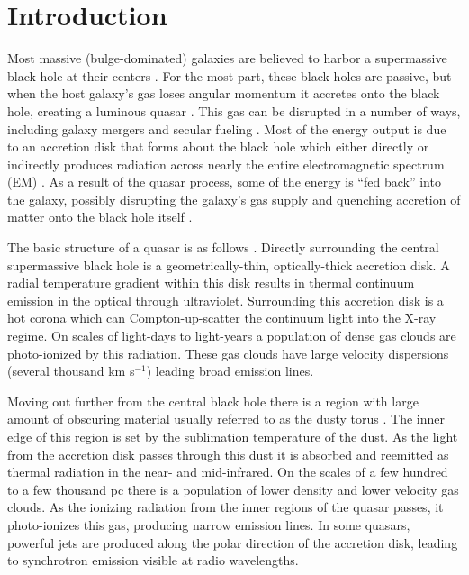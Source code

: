 \chapter{Introduction}

Most massive (bulge-dominated) galaxies are believed to harbor a supermassive black hole at their centers \citep{Kormendy:1995}.  For the most part, these black holes are passive, but when the host galaxy's gas loses angular momentum it accretes onto the black hole, creating a luminous quasar \citep{Lynden-Bell:1969}. This gas can be disrupted in a number of ways, including galaxy mergers \citep[e.g.][]{Kauffmann:2000, Hopkins:2006} and secular fueling \citep[e.g.][and references therein]{Hopkins:2009}. Most of the energy output is due to an accretion disk that forms about the black hole which either directly or indirectly produces radiation across nearly the entire electromagnetic spectrum (EM) \citep{Elvis:1994}.  As a result of the quasar process, some of the energy is ``fed back'' into the galaxy, possibly disrupting the galaxy's gas supply \citep{Silk:1998,Fabian:1999} and quenching accretion of matter onto the black hole itself \citep[e.g.,][]{Di-Matteo:2005, Djorgovski:2008}.  

The basic structure of a quasar is as follows \citep[e.g.][]{Antonucci:1993,Urry:1995,Krolik:1999,Heckman:2014}.  Directly surrounding the central supermassive black hole is a geometrically-thin, optically-thick accretion disk. A radial temperature gradient within this disk results in thermal continuum emission in the optical through ultraviolet.  Surrounding this accretion disk is a hot corona which can Compton-up-scatter the continuum light into the X-ray regime.  On scales of light-days to light-years a population of dense gas clouds are photo-ionized by this radiation.  These gas clouds have large velocity dispersions (several thousand km s$^{-1}$) leading broad emission lines.  

Moving out further from the central black hole there is a region with large amount of obscuring material usually referred to as the dusty torus \citep{Krolik:1988, Pier:1992, Krolik:1999, Beckmann:2012}.  The inner edge of this region is set by the sublimation temperature of the dust.  As the light from the accretion disk passes through this dust it is absorbed and reemitted as thermal radiation in the near- and mid-infrared.  On the scales of a few hundred to a few thousand pc there is a population of lower density and lower velocity gas clouds.  As the ionizing radiation from the inner regions of the quasar passes, it photo-ionizes this gas, producing narrow emission lines.  In some quasars, powerful jets are produced along the polar direction of the accretion disk, leading to synchrotron emission visible at radio wavelengths.


